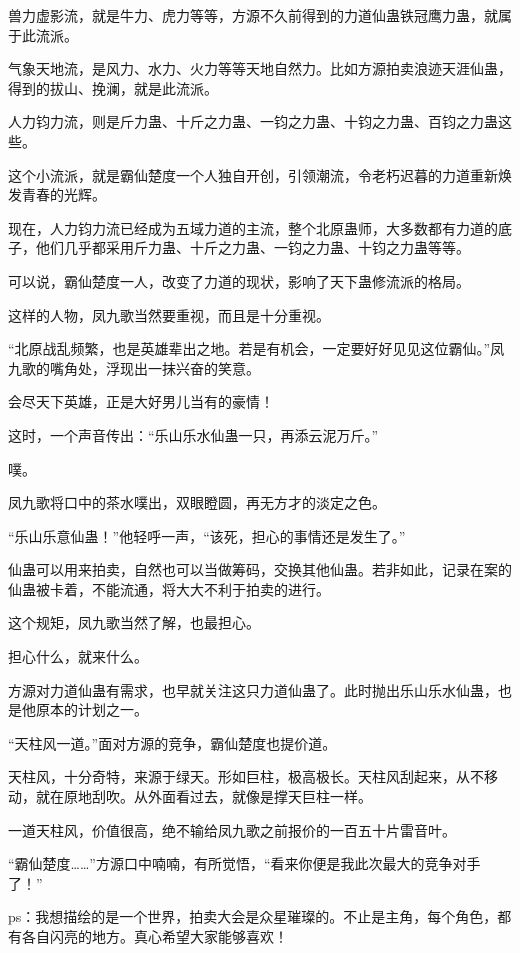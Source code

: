 \begin{this_body}
兽力虚影流，就是牛力、虎力等等，方源不久前得到的力道仙蛊铁冠鹰力蛊，就属于此流派。

气象天地流，是风力、水力、火力等等天地自然力。比如方源拍卖浪迹天涯仙蛊，得到的拔山、挽澜，就是此流派。

人力钧力流，则是斤力蛊、十斤之力蛊、一钧之力蛊、十钧之力蛊、百钧之力蛊这些。

这个小流派，就是霸仙楚度一个人独自开创，引领潮流，令老朽迟暮的力道重新焕发青春的光辉。

现在，人力钧力流已经成为五域力道的主流，整个北原蛊师，大多数都有力道的底子，他们几乎都采用斤力蛊、十斤之力蛊、一钧之力蛊、十钧之力蛊等等。

可以说，霸仙楚度一人，改变了力道的现状，影响了天下蛊修流派的格局。

这样的人物，凤九歌当然要重视，而且是十分重视。

“北原战乱频繁，也是英雄辈出之地。若是有机会，一定要好好见见这位霸仙。”凤九歌的嘴角处，浮现出一抹兴奋的笑意。

会尽天下英雄，正是大好男儿当有的豪情！

这时，一个声音传出：“乐山乐水仙蛊一只，再添云泥万斤。”

噗。

凤九歌将口中的茶水噗出，双眼瞪圆，再无方才的淡定之色。

“乐山乐意仙蛊！”他轻呼一声，“该死，担心的事情还是发生了。”

仙蛊可以用来拍卖，自然也可以当做筹码，交换其他仙蛊。若非如此，记录在案的仙蛊被卡着，不能流通，将大大不利于拍卖的进行。

这个规矩，凤九歌当然了解，也最担心。

担心什么，就来什么。

方源对力道仙蛊有需求，也早就关注这只力道仙蛊了。此时抛出乐山乐水仙蛊，也是他原本的计划之一。

“天柱风一道。”面对方源的竞争，霸仙楚度也提价道。

天柱风，十分奇特，来源于绿天。形如巨柱，极高极长。天柱风刮起来，从不移动，就在原地刮吹。从外面看过去，就像是撑天巨柱一样。

一道天柱风，价值很高，绝不输给凤九歌之前报价的一百五十片雷音叶。

“霸仙楚度……”方源口中喃喃，有所觉悟，“看来你便是我此次最大的竞争对手了！”

ps：我想描绘的是一个世界，拍卖大会是众星璀璨的。不止是主角，每个角色，都有各自闪亮的地方。真心希望大家能够喜欢！

\end{this_body}

